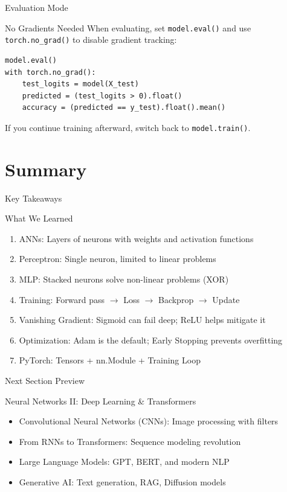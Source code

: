 \documentclass[hyperref={pdfpagelabels=false},aspectratio=169]{beamer}
\begin{document}
\begin{frame}[label={sec:org4b1eacc},fragile]{Evaluation Mode}
 \begin{block}{No Gradients Needed}
\pause
When evaluating, set \texttt{model.eval()} and use \texttt{torch.no\_grad()} to disable gradient tracking:
\pause
\begin{verbatim}
model.eval()
with torch.no_grad():
    test_logits = model(X_test)
    predicted = (test_logits > 0).float()
    accuracy = (predicted == y_test).float().mean()
\end{verbatim}
If you continue training afterward, switch back to \texttt{model.train()}.
\end{block}
\end{frame}
\section{Summary}
\label{sec:orgf785473}
\begin{frame}[label={sec:orgafebd5e}]{Key Takeaways}
\begin{block}{What We Learned}
\pause
\begin{enumerate}[<+->]
\item \alert{ANNs}: Layers of neurons with weights and activation functions
\item \alert{Perceptron}: Single neuron, limited to linear problems
\item \alert{MLP}: Stacked neurons solve non-linear problems (XOR)
\item \alert{Training}: Forward pass \(\rightarrow\) Loss \(\rightarrow\) Backprop \(\rightarrow\) Update
\item \alert{Vanishing Gradient}: Sigmoid can fail deep; ReLU helps mitigate it
\item \alert{Optimization}: Adam is the default; Early Stopping prevents overfitting
\item \alert{PyTorch}: Tensors + nn.Module + Training Loop
\end{enumerate}
\end{block}
\end{frame}
\begin{frame}[label={sec:orgb93ef77}]{Next Section Preview}
\begin{block}{Neural Networks II: Deep Learning \& Transformers}
\pause
\begin{itemize}[<+->]
\item \alert{Convolutional Neural Networks (CNNs)}: Image processing with filters
\item \alert{From RNNs to Transformers}: Sequence modeling revolution
\item \alert{Large Language Models}: GPT, BERT, and modern NLP
\item \alert{Generative AI}: Text generation, RAG, Diffusion models
\end{itemize}
\end{block}
\end{frame}
\end{document}
